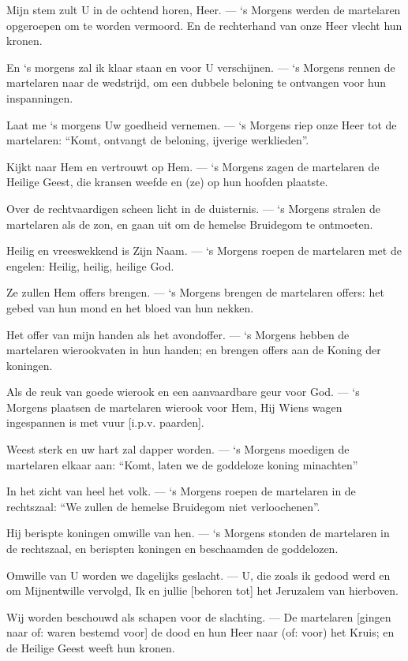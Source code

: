 \documentclass[12pt,twoside,a5paper]{article}
\newlength{\origparskip}
\newenvironment{halfparskip}{
  \setlength{\parskip}{0.5\origparskip}
}{
  \setlength{\parskip}{\origparskip}
}
\begin{document}
\begin{halfparskip}
  Mijn stem zult U in de ochtend horen, Heer. --- `s Morgens werden de martelaren opgeroepen om te worden vermoord. En de rechterhand van onze Heer vlecht hun kronen.

  En `s morgens zal ik klaar staan en voor U verschijnen. --- `s Morgens rennen de martelaren naar de wedstrijd, om een dubbele beloning te ontvangen voor hun inspanningen.

  Laat me `s morgens Uw goedheid vernemen. --- `s Morgens riep onze Heer tot de martelaren: ``Komt, ontvangt de beloning, ijverige werklieden''.

  Kijkt naar Hem en vertrouwt op Hem. --- `s Morgens zagen de martelaren de Heilige Geest, die kransen weefde en (ze) op hun hoofden plaatste.

  Over de rechtvaardigen scheen licht in de duisternis. --- `s Morgens stralen de martelaren als de zon, en gaan uit om de hemelse Bruidegom te ontmoeten.

  Heilig en vreeswekkend is Zijn Naam. --- `s Morgens roepen de martelaren met de engelen: Heilig, heilig, heilige God.

  Ze zullen Hem offers brengen. --- `s Morgens brengen de martelaren offers: het gebed van hun mond en het bloed van hun nekken.

  Het offer van mijn handen als het avondoffer. --- `s Morgens hebben de martelaren wierookvaten in hun handen; en brengen offers aan de Koning der koningen.

  Als de reuk van goede wierook en een aanvaardbare geur voor God. --- `s Morgens plaatsen de martelaren wierook voor Hem, Hij Wiens wagen ingespannen is met vuur [i.p.v. paarden].

  Weest sterk en uw hart zal dapper worden. --- `s Morgens moedigen de martelaren elkaar aan: ``Komt, laten we de goddeloze koning minachten''

  In het zicht van heel het volk. --- `s Morgens roepen de martelaren in de rechtszaal: ``We zullen de hemelse Bruidegom niet verloochenen''.

  Hij berispte koningen omwille van hen. --- `s Morgens stonden de martelaren in de rechtszaal, en berispten koningen en beschaamden de goddelozen.

  Omwille van U worden we dagelijks geslacht. --- U, die zoals ik gedood werd en om Mijnentwille vervolgd, Ik en jullie [behoren tot] het Jeruzalem van hierboven.

  Wij worden beschouwd als schapen voor de slachting. --- De martelaren [gingen naar of: waren bestemd voor] de dood en hun Heer naar (of: voor) het Kruis; en de Heilige Geest weeft hun kronen.


\end{halfparskip}
\end{document}
